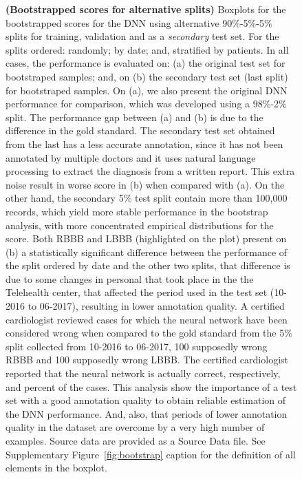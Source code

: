\documentclass{article}
\begin{document}
\begin{figure}[h]
    \centering
    \caption{\footnotesize{\textbf{(Bootstrapped scores for alternative splits)} Boxplots for the bootstrapped  scores for the DNN using alternative 90\%-5\%-5\% splits for training, validation and as a \textit{secondary} test set. For the splits ordered: randomly; by date; and, stratified by patients. In all cases, the performance is evaluated on: (a) the original test set for  bootstraped samples; and, on (b) the secondary test set (last  split) for  bootstraped samples.   On (a), we also present the original DNN performance for comparison, which was developed using a 98\%-2\% split. The performance gap between (a) and (b) is due to the difference in the gold standard. The secondary test set obtained from the last  has a less accurate annotation, since it has not been annotated by multiple doctors and it uses natural language processing to extract the diagnosis from a written report. This extra noise result in worse  score in (b) when compared with (a). On the other hand, the secondary 5\% test split contain more than 100,000 records, which yield more stable performance in the bootstrap analysis, with more concentrated empirical distributions for the  score. Both RBBB and LBBB (highlighted on the plot) present on (b) a statistically significant difference between the performance of the split ordered by date and the other two splits, that difference is due to some changes in personal that took place in the the Telehealth center, that affected the period used in the test set (10-2016 to 06-2017), resulting in lower annotation quality. A certified cardiologist reviewed  cases for which the neural network have been considered wrong when compared to the gold standard from the 5\% split collected from 10-2016 to 06-2017, 100 supposedly wrong RBBB and 100 supposedly wrong LBBB. The certified cardiologist reported that the neural network is actually correct, respectively,  and  percent of the cases. This analysis show the importance of a test set with a good annotation quality to obtain reliable estimation of the DNN performance. And, also, that periods of lower annotation quality in the dataset are overcome by a very high number of examples. Source data are provided as a Source Data file. See Supplementary Figure~\ref{fig:bootstrap} caption for the definition of all elements in the boxplot.}}
    \label{fig:boxplot_F1_score_on_newtest}
\end{figure}
\end{document}

